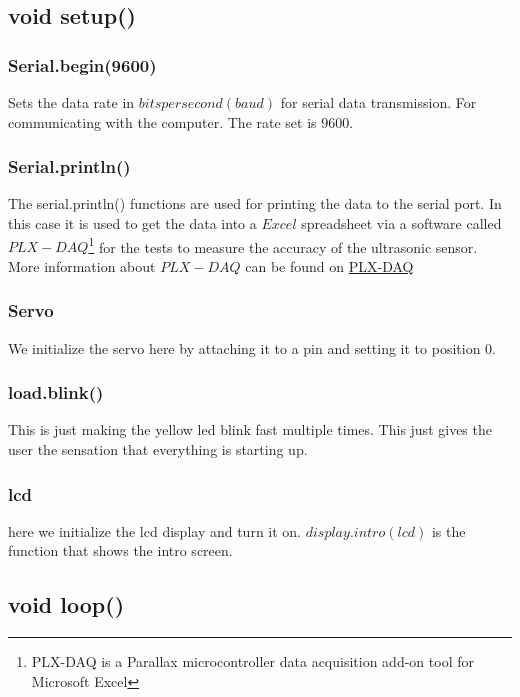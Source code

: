 \subsection{void setup()}


\subsubsection{Serial.begin(9600)}
Sets the data rate in $bits per second (baud)$ for serial data transmission. For communicating with the computer. The rate set is $9600$.
\subsubsection{Serial.println()}
The serial.println() functions are used for printing the data to the serial port. In this case it is used to get the data into a $Excel$ spreadsheet via a software called $PLX-DAQ$\footnote{PLX-DAQ is a Parallax microcontroller data acquisition add-on tool for Microsoft Excel} for the tests to measure the accuracy of the ultrasonic sensor. More information about $PLX-DAQ$ can be found on \href{https://www.parallax.com/downloads/plx-daq}{PLX-DAQ}  

\subsubsection{Servo}
We initialize the servo here by attaching it to a pin and setting it to position $0$.

\subsubsection{load.blink()}
This is just making the yellow led blink fast multiple times. This just gives the user the sensation that everything is starting up.

\subsubsection{lcd}
here we initialize the lcd display and turn it on. 
$display.intro(lcd)$ is the function that shows the intro screen.

\subsection{void loop()} \label{voidloop}


